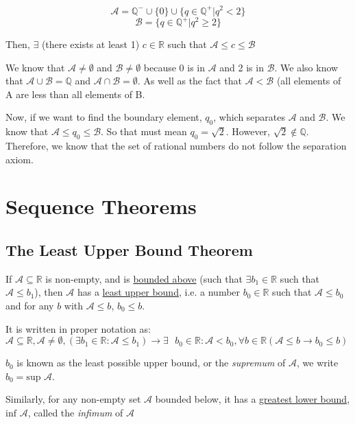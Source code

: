 \documentclass[11 pt, twoside]{article}
\begin{document}
$$\mathcal{A} = \mathbb{Q}^- \cup \{0\} \cup \{q \in \mathbb{Q}^+ | q^2 < 2\}$$
$$\mathcal{B} = \{q \in \mathbb{Q}^+ | q^2 \geq 2\}$$

Then, $\exists$ (there exists at least 1) $c \in \mathbb{R}$ such that $\mathcal{A} \leq c \leq \mathcal{B}$

We know that $\mathcal{A} \neq \emptyset$ and $\mathcal{B} \neq \emptyset$
because 0 is in $\mathcal{A}$ and 2 is in $\mathcal{B}$. We also know that
$\mathcal{A} \cup \mathcal{B} = \mathbb{Q}$ and $\mathcal{A} \cap \mathcal{B}
= \emptyset$. As well as the fact that $\mathcal{A} < \mathcal{B}$ (all elements of A are less than all elements of B.

Now, if we want to find the boundary element, $q_0$, which separates
$\mathcal{A}$ and $\mathcal{B}$. We know that $\mathcal{A} \leq q_0 \leq
\mathcal{B}$. So that must mean $q_0 = \sqrt{2}$. However, $\sqrt{2} \notin
\mathbb{Q}$. Therefore, we know that the set of rational numbers do not
follow the separation axiom.

\section{Sequence Theorems}
\subsection{The Least Upper Bound Theorem}

If $\mathcal{A} \subseteq \mathbb{R}$
is non-empty, and is \underline{bounded above} (such that $\exists b_1 \in \mathbb{R}$
such that $\mathcal{A} \leq b_1$), then $\mathcal{A}$ has a
\underline{least upper bound}, i.e. a number $b_0 \in \mathbb{R}$ such that
$\mathcal{A} \leq b_0$ and for any $b$ with $\mathcal{A} \leq b$, $b_0 \leq b$.

It is written in proper notation as:
$\mathcal{A}\subseteq\mathbb{R}, \mathcal{A} \neq \emptyset, (\exists\text{
} b_1 \in \mathbb{R}: \mathcal{A} \leq b_1)\to \exists\text{ } b_0 \in
\mathbb{R}: \mathcal{A} < b_0, \forall b \in \mathbb{R} (\mathcal{A} \leq
b \to b_0 \leq b)$

$b_0$ is known as the least possible upper bound, or the \textit{supremum} of
$\mathcal{A}$, we write $b_0 = \textrm{sup } \mathcal{A}$.


Similarly, for any non-empty set $\mathcal{A}$ bounded below, it has a
\underline{greatest lower bound}, $\textrm{inf } \mathcal{A}$, called the \textit{infimum}
of $\mathcal{A}$
\end{document}

